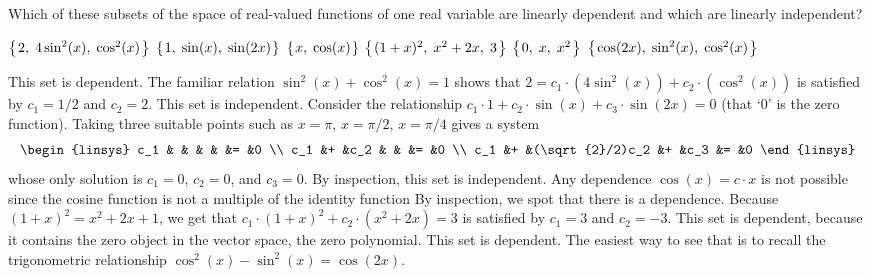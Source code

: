 
\begin{Exercise}[
name={},
title={}, 
difficulty=0,
origin={\cite{JH}}]
    Which of these subsets of the space of real-valued functions
    of one real variable are linearly dependent and which are linearly
    independent?
\begin{multicols}{2}
\Question \( \mbox{$\left\{\hspace{0.1em}2,\;4\sin^2(x),\;\cos^2(x)\hspace{0.1em}\right\}$} \)
\Question \( \mbox{$\left\{\hspace{0.1em}1,\;\sin(x),\;\sin(2x)\hspace{0.1em}\right\}$} \)
\Question \( \mbox{$\left\{\hspace{0.1em}x,\;\cos(x)\hspace{0.1em}\right\}$} \)
\Question \( \mbox{$\left\{\hspace{0.1em}(1+x)^2,\;x^2+2x,\;3\hspace{0.1em}\right\}$} \)
\Question \( \mbox{$\left\{\hspace{0.1em}0,\;x,\;x^2\hspace{0.1em}\right\}$} \)
\Question \( \mbox{$\left\{\hspace{0.1em}\cos(2x),\;\sin^2(x),\;\cos^2(x)\hspace{0.1em}\right\}$} \)
\EndCurrentQuestion
\end{multicols}
\end{Exercise}

\begin{Answer}
        \Question This set is dependent.
          The familiar relation $\sin^2(x)+\cos^2(x)=1$ shows that
          $2=c_1\cdot(4\sin^2(x))+c_2\cdot(\cos^2(x))$ is satisfied by
          $c_1=1/2$ and $c_2=2$.
        \Question This set is independent.
          Consider the relationship
          $c_1\cdot 1+c_2\cdot\sin(x)+c_3\cdot\sin(2x)=0$
          (that `$0$' is the zero function).
          Taking three suitable points such as $x=\pi$, $x=\pi/2$, $x=\pi/4$ 
          gives a system
          \begin{equation*}
            \begin{linsys}{3}
               c_1  &   &                &   &      &=  &0  \\
               c_1  &+  &c_2             &   &      &=  &0  \\
               c_1  &+  &(\sqrt{2}/2)c_2 &+  &c_3   &=  &0  
            \end{linsys}
          \end{equation*}
          whose only solution is 
          $c_1=0$, $c_2=0$, and $c_3=0$. 
        \Question By inspection, this set is independent.
          Any dependence $\cos(x)=c\cdot x$ is not possible since the cosine
          function is not a multiple of the identity function
        \Question By inspection, we spot that there is a dependence.
          Because $(1+x)^2=x^2+2x+1$, we get that
          $c_1\cdot(1+x)^2+c_2\cdot(x^2+2x)=3$ is satisfied by 
          $c_1=3$ and $c_2=-3$.
	\Question This set is dependent, because it contains the
          zero object in the vector space, the zero polynomial.
        \Question This set is dependent.
          The easiest way to see that is to recall the trigonometric
          relationship $\cos^2(x)-\sin^2(x)=\cos(2x)$.

\end{Answer}
